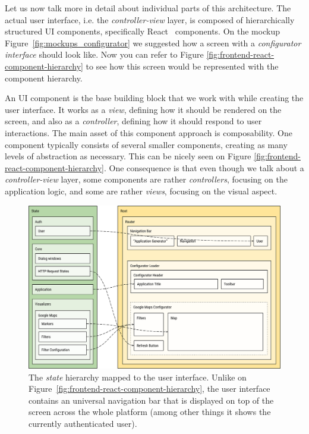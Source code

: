 Let us now talk more in detail about individual parts of this architecture. The actual user interface, i.e. the \emph{controller-view} layer, is composed of hierarchically structured UI components, specifically React~\cite{react} components. On the mockup Figure~\ref{fig:mockups_configurator} we suggested how a screen with a \emph{configurator interface} should look like. Now you can refer to Figure \ref{fig:frontend-react-component-hierarchy} to see how this screen would be represented with the component hierarchy.

An UI component is the base building block that we work with while creating the user interface. It works as a \emph{view}, defining how it should be rendered on the screen, and also as a \emph{controller}, defining how it should respond to user interactions. The main asset of this component approach is composability. One component typically consists of several smaller components, creating as many levels of abstraction as necessary. This can be nicely seen  on Figure \ref{fig:frontend-react-component-hierarchy}. One consequence is that even though we talk about a \emph{controller-view} layer, some components are rather \emph{controllers}, focusing on the application logic, and some are rather \emph{views}, focusing on the visual aspect.
\begin{figure}
	\centering
	\includegraphics[width=140mm]{img/04_frontend_state_structure.png}
	\caption{The \emph{state} hierarchy mapped to the user interface. Unlike on Figure~\ref{fig:frontend-react-component-hierarchy}, the user interface contains an universal navigation bar that is displayed on top of the screen across the whole platform (among other things it shows the currently authenticated user).} 
	\label{fig:frontend-state-structure}
\end{figure}

